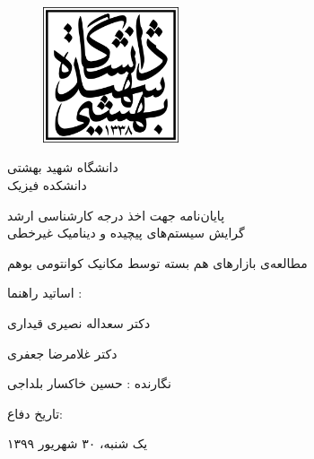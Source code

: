 \documentclass[a4paper,titlepage,12pt,fleqn,oneside]{report}
\begin{document}
	
	
	
	~~~~~~~~~\newpage
	\thispagestyle{empty}
	
	\begin{figure}[h]
		\begin{center}
			\includegraphics[height=4cm]{sbu-logo-LimooGraphic.eps}
		\end{center}
	\end{figure}
	
	\begin{center}
		\LARGE{دانشگاه شهید بهشتی}\\
		\LARGE{دانشکده فیزیک}\\
	\end{center}
	\vspace{5mm}
	\begin{center}
		پایان‌نامه جهت اخذ درجه کارشناسی ارشد\\
		گرایش سیستم‌های پیچیده و دینامیک غیرخطی
	\end{center}
	\vspace{0.5cm}
	
	\begin{center}
		\Huge{مطالعه‌ی بازار‌های هم بسته توسط مکانیک کوانتومی بوهم} 
	\end{center}
	\vspace{1cm}
	\begin{center}
		اساتید راهنما : 
		
		دکتر سعداله نصیری قیداری 
		
		دکتر غلامرضا  جعفری
	\end{center}
	\vspace{1cm}
	\begin{center}
		نگارنده : حسین خاکسار بلداجی
	\end{center}
	\vspace{0.5cm}
	\begin{center}
		تاریخ دفاع:
		
		یک شنبه، ۳۰ شهریور ۱۳۹۹
	\end{center}
	\newpage
	\tableofcontents
	\listoffigures
\end{document}
